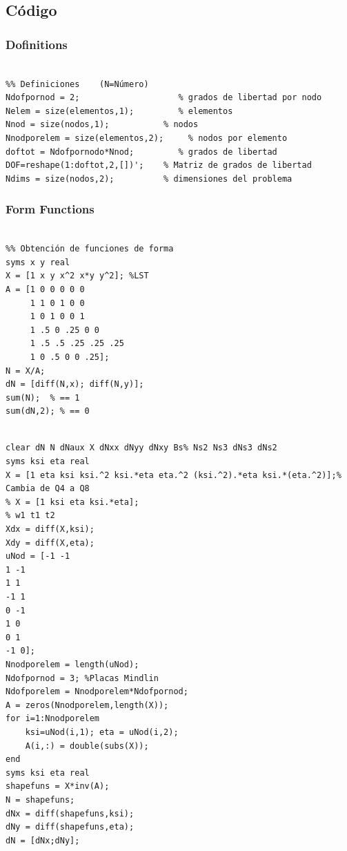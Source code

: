    \subsection*{Código \Matlab{}}
    \subsubsection*{Dofinitions}
    \begin{code}
    \begin{verbatim}

%% Definiciones    (N=Número)
Ndofpornod = 2;                    % grados de libertad por nodo
Nelem = size(elementos,1);         % elementos
Nnod = size(nodos,1);           % nodos
Nnodporelem = size(elementos,2);     % nodos por elemento
doftot = Ndofpornodo*Nnod;         % grados de libertad
DOF=reshape(1:doftot,2,[])';    % Matriz de grados de libertad
Ndims = size(nodos,2);          % dimensiones del problema
\end{verbatim}
\end{code}
\subsubsection*{Form Functions}
\begin{code}
\begin{verbatim}

%% Obtención de funciones de forma
syms x y real 
X = [1 x y x^2 x*y y^2]; %LST
A = [1 0 0 0 0 0
     1 1 0 1 0 0
     1 0 1 0 0 1
     1 .5 0 .25 0 0
     1 .5 .5 .25 .25 .25
     1 0 .5 0 0 .25]; 
N = X/A;
dN = [diff(N,x); diff(N,y)];
sum(N);  % == 1
sum(dN,2); % == 0        
\end{verbatim}
\end{code}

\begin{code}[Q8]
	\begin{verbatim}
	
clear dN N dNaux X dNxx dNyy dNxy Bs% Ns2 Ns3 dNs3 dNs2
syms ksi eta real
X = [1 eta ksi ksi.^2 ksi.*eta eta.^2 (ksi.^2).*eta ksi.*(eta.^2)];%
Cambia de Q4 a Q8
% X = [1 ksi eta ksi.*eta];
% w1 t1 t2
Xdx = diff(X,ksi);
Xdy = diff(X,eta);
uNod = [-1 -1
1 -1
1 1
-1 1
0 -1
1 0
0 1
-1 0];
Nnodporelem = length(uNod);
Ndofpornod = 3; %Placas Mindlin
Ndofporelem = Nnodporelem*Ndofpornod;
A = zeros(Nnodporelem,length(X));
for i=1:Nnodporelem
	ksi=uNod(i,1); eta = uNod(i,2);
	A(i,:) = double(subs(X));
end
syms ksi eta real
shapefuns = X*inv(A);
N = shapefuns;
dNx = diff(shapefuns,ksi);
dNy = diff(shapefuns,eta);
dN = [dNx;dNy];     
	\end{verbatim}
\end{code}


